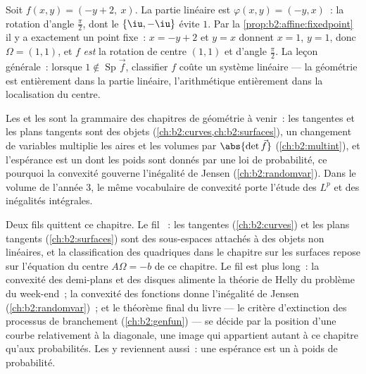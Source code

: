 \begin{example}\label{ex:b2:affine:rotationcenter}
Soit $f(x, y) = (-y + 2,\ x)$. La partie linéaire est
$\varphi(x, y) = (-y, x)$~: la rotation d'angle $\frac\pi2$,
dont le  $\{\iu, -\iu\}$ évite $1$. Par
la \cref{prop:b2:affine:fixedpoint} il y a exactement un point fixe~:
$x = -y + 2$ et $y = x$ donnent $x = 1$, $y = 1$, donc
$\Omega = (1, 1)$, et $f$ \emph{est} la rotation de centre
$(1, 1)$ et d'angle $\frac\pi2$. La leçon générale~: lorsque $1
\notin \operatorname{Sp}\vec f$, classifier $f$ coûte un
système linéaire --- la géométrie est entièrement dans la partie
linéaire, l'arithmétique entièrement dans la localisation du centre.
\end{example}

\begin{remark}
Les  et les  sont la grammaire des
chapitres de géométrie à venir~: les tangentes et les plans tangents
sont des objets 
(\cref{ch:b2:curves,ch:b2:surfaces}), un changement de
variables  multiplie les aires et les volumes par
$\abs{\det \vec f}$ (\cref{ch:b2:multint}), et l'espérance
est un  dont les poids sont donnés par une loi de
probabilité, ce pourquoi la convexité gouverne l'inégalité de Jensen
(\cref{ch:b2:randomvar}). Dans le volume de l'année 3, le même
vocabulaire de convexité porte l'étude des  $L^p$ et des
inégalités intégrales.
\end{remark}

\begin{remark}
Deux fils quittent ce chapitre. Le fil \emph{}~:
les tangentes (\cref{ch:b2:curves}) et les plans tangents
(\cref{ch:b2:surfaces}) sont des sous-espaces  attachés à
des objets non linéaires, et la classification des quadriques dans le
chapitre sur les surfaces repose sur l'équation du centre
$A\Omega = -b$ de ce chapitre. Le fil \emph{} est plus long~:
la convexité des demi-plans et des disques alimente la théorie de
Helly du problème du week-end~; la convexité des fonctions donne
l'inégalité de Jensen (\cref{ch:b2:randomvar})~; et le théorème final
du livre --- le critère d'extinction des processus de branchement
(\cref{ch:b2:genfun}) --- se décide par la position d'une
courbe  relativement à la diagonale, une image qui appartient
autant à ce chapitre qu'aux probabilités. Les 
y reviennent aussi~: une espérance est un  à poids de
probabilité.
\end{remark}

